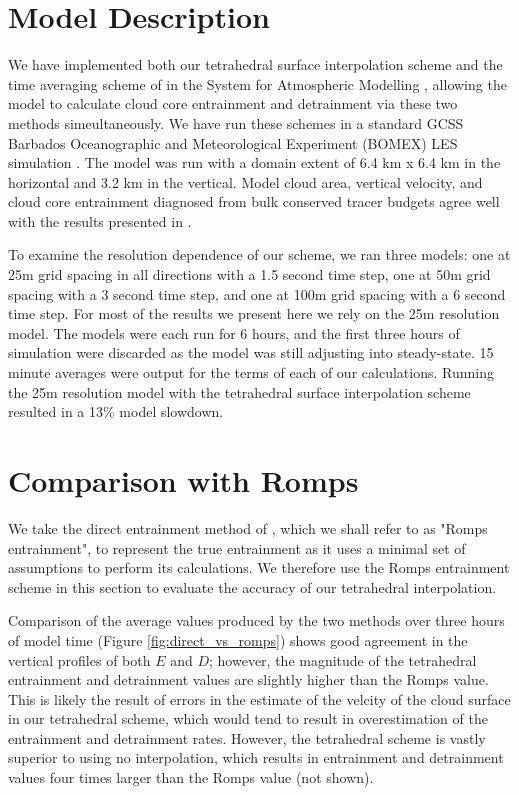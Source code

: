 \documentclass[12pt]{article}
\begin{document}

\section{Model Description}

We have implemented both our tetrahedral surface interpolation scheme and the 
time averaging scheme of \cite{Romps2010} in the System for Atmospheric 
Modelling \citep[SAM;][]{Khairoutdinov2003}, allowing the model to calculate 
cloud core entrainment and detrainment via these two methods simeultaneously.
We have run these schemes in a standard GCSS Barbados Oceanographic and 
Meteorological Experiment (BOMEX) LES simulation \citep{Holland1973, 
Siebesma2003}.  The model was run with a domain extent of 6.4 km x 6.4 km in 
the horizontal and 3.2 km in the vertical.  Model cloud area, vertical 
velocity, and cloud core entrainment diagnosed from bulk conserved tracer 
budgets agree well with the results presented in \cite{Siebesma2003}.

To examine the resolution dependence of our scheme, we ran three models: one at 
25m grid spacing in all directions with a 1.5 second time step, one at 50m grid 
spacing with a 3 second time step, and one at 100m grid spacing with a 6 second 
time step.  For most of the results we present here we rely on the 25m 
resolution model.  The models were each run for 6 hours, and the first 
three hours of simulation were discarded as the model was still adjusting into 
steady-state.  15 minute averages were output for the terms of each of our 
calculations.  Running the 25m resolution model with the tetrahedral surface 
interpolation scheme resulted in a 13\% model slowdown.  


\section{Comparison with Romps}

We take the direct entrainment method of \cite{Romps2010}, which we shall 
refer to as "Romps entrainment", to represent the true entrainment as it uses 
a minimal set of assumptions to perform its calculations.  We therefore use 
the Romps entrainment scheme in this section to evaluate the accuracy of our 
tetrahedral interpolation.

Comparison of the average values produced by the two methods over three hours 
of model time (Figure \ref{fig:direct_vs_romps}) shows good agreement in the 
vertical profiles of both $E$ and $D$; however, the magnitude of the 
tetrahedral entrainment and detrainment values are slightly higher than the 
Romps value.  This is likely the result of errors in the estimate of the 
velcity of the cloud surface in our tetrahedral scheme, which would tend to 
result in overestimation of the entrainment and detrainment rates.  
However, the tetrahedral scheme is vastly superior to using no interpolation, 
which results in entrainment and detrainment values four times larger than 
the Romps value (not shown).  
\end{document}
